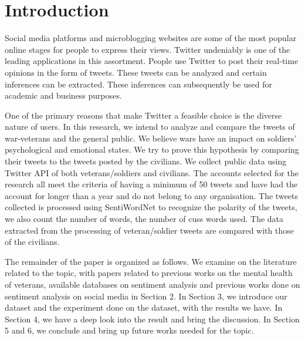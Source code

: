 \section{Introduction}

Social media platforms and microblogging websites are some of the most popular online stages for people to express their views. Twitter undeniably is one of the leading applications in this assortment. People use Twitter to post their real-time opinions in the form of tweets. These tweets can be analyzed and certain inferences can be extracted. These inferences can subsequently be used for academic and business purposes.

One of the primary reasons that make Twitter a feasible choice is the diverse nature of users. In this research, we intend to analyze and compare the tweets of war-veterans and the general public. We believe wars have an impact on soldiers' psychological and emotional states. We try to prove this hypothesis by comparing their tweets to the tweets posted by the civilians. We collect public data using Twitter API of both veterans/soldiers and civilians. The accounts selected for the research all meet the criteria of having a minimum of 50 tweets and have had the account for longer than a year and do not belong to any organisation. The tweets collected is processed using SentiWordNet to recognize the polarity of the tweets, we also count the number of words, the number of cuss words used. The data extracted from the processing of veteran/soldier tweets are compared with those of the civilians.

The remainder of the paper is organized as follows. We examine on the literature related to the topic, with papers related to previous works on the mental health of veterans, available databases on sentiment analysis and previous works done on sentiment analysis on social media in Section 2. In Section 3, we introduce our dataset and the experiment done on the dataset, with the results we have. In Section 4, we have a deep look into the result and bring the discussion. In Section 5 and 6, we conclude and bring up future works needed for the topic.
